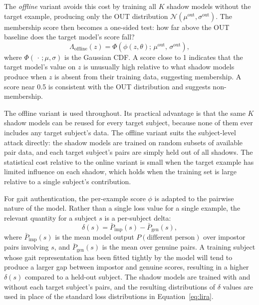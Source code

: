 The \emph{offline} variant avoids this cost by training all $K$ shadow models without the target example, producing only the OUT distribution $\mathcal{N}(\mu^{\text{out}}, \sigma^{\text{out}})$. The membership score then becomes a one-sided test: how far above the OUT baseline does the target model's score fall?
\begin{equation}
  \Lambda_{\text{offline}}(z)
  = \Phi\!\left(\phi(z, \theta);\, \mu^{\text{out}},\, \sigma^{\text{out}}\right),
  \label{eq:lira_offline}
\end{equation}
where $\Phi(\,\cdot\,; \mu, \sigma)$ is the Gaussian CDF. A score close to 1 indicates that the target model's value on $z$ is unusually high relative to what shadow models produce when $z$ is absent from their training data, suggesting membership. A score near 0.5 is consistent with the OUT distribution and suggests non-membership.

The offline variant is used throughout. Its practical advantage is that the same $K$ shadow models can be reused for every target subject, because none of them ever includes any target subject's data. The offline variant suits the subject-level attack directly: the shadow models are trained on random subsets of available pair data, and each target subject's pairs are simply held out of all shadows. The statistical cost relative to the online variant is small when the target example has limited influence on each shadow, which holds when the training set is large relative to a single subject's contribution.

For gait authentication, the per-example score $\phi$ is adapted to the pairwise nature of the model. Rather than a single loss value for a single example, the relevant quantity for a subject $s$ is a per-subject delta:
\begin{equation}
  \delta(s) = \bar{P}_{\text{imp}}(s) - \bar{P}_{\text{gen}}(s),
  \label{eq:bg_delta}
\end{equation}
where $\bar{P}_{\text{imp}}(s)$ is the mean model output $P(\text{different person})$ over impostor pairs involving $s$, and $\bar{P}_{\text{gen}}(s)$ is the mean over genuine pairs. A training subject whose gait representation has been fitted tightly by the model will tend to produce a larger gap between impostor and genuine scores, resulting in a higher $\delta(s)$ compared to a held-out subject. The shadow models are trained with and without each target subject's pairs, and the resulting distributions of $\delta$ values are used in place of the standard loss distributions in Equation~\eqref{eq:lira}.

